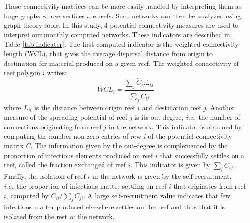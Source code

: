 \documentclass[utf8]{frontiersSCNS}
\newcommand{\ie}{{\it i.e.}\ }
\begin{document}
These connectivity matrices can be more easily handled by interpreting them as large graphs whose vertices are reefs. Such networks can then be analyzed using graph theory tools. In this study, 4 potential connectivity measures are used to interpret our monthly computed networks. These indicators are described in Table \ref{tab:indicator}. The first computed indicator is the weighted connectivity length (WCL), that gives the average dispersal distance from origin to destination for material produced on a given reef. The weighted connectivity of reef polygon $i$ writes:
\begin{equation}
    WCL_i = \dfrac{\sum_j \tilde{C}_{ij} L_{ij}}{\sum_j \tilde{C}_{ij}}
\end{equation}
where $L_{ji}$ is the distance between origin reef $i$ and destination reef $j$. Another measure of the spreading potential of reef $j$ is its out-degree, \ie the number of connections originating from reef $j$ in the network. This indicator is obtained by computing the number non-zero entries of row $i$ of the potential connectivity matrix $\tilde{C}$. The information given by the out-degree is complemented by the proportion of infectious elements produced on reef $i$ that successfully settles on a reef, called the fraction exchanged of reef $i$. This indicator is given by $\sum_{j} \tilde{C}_{ij}$. Finally, the isolation of reef $i$ in the network is given by the self recruitment, \ie the proportion of infectious matter settling on reef $i$ that originates from reef $i$, computed by $C_{ii}/\sum_jC_{ji}$. A large self-recruitment value indicates that few infectious matter produced elsewhere settles on the reef and thus that it is isolated from the rest of the network. 
\end{document}

